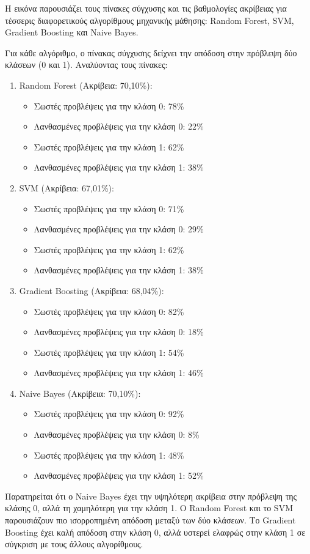 Η εικόνα παρουσιάζει τους πίνακες σύγχυσης και τις βαθμολογίες
ακρίβειας για τέσσερις διαφορετικούς αλγορίθμους μηχανικής μάθησης:
Random Forest, SVM, Gradient Boosting και Naive Bayes.

Για κάθε αλγόριθμο, ο πίνακας σύγχυσης δείχνει την απόδοση στην
πρόβλεψη δύο κλάσεων (0 και 1). Αναλύοντας τους πίνακες:

\begin{enumerate}
  \item Random Forest (Ακρίβεια: 70,10\%):
    \begin{itemize}
      \item Σωστές προβλέψεις για την κλάση 0: 78\%
      \item Λανθασμένες προβλέψεις για την κλάση 0: 22\%
      \item Σωστές προβλέψεις για την κλάση 1: 62\%
      \item Λανθασμένες προβλέψεις για την κλάση 1: 38\%
    \end{itemize}

  \item SVM (Ακρίβεια: 67,01\%):
    \begin{itemize}
      \item Σωστές προβλέψεις για την κλάση 0: 71\%
      \item Λανθασμένες προβλέψεις για την κλάση 0: 29\%
      \item Σωστές προβλέψεις για την κλάση 1: 62\%
      \item Λανθασμένες προβλέψεις για την κλάση 1: 38\%
    \end{itemize}

  \item Gradient Boosting (Ακρίβεια: 68,04\%):
    \begin{itemize}
      \item Σωστές προβλέψεις για την κλάση 0: 82\%
      \item Λανθασμένες προβλέψεις για την κλάση 0: 18\%
      \item Σωστές προβλέψεις για την κλάση 1: 54\%
      \item Λανθασμένες προβλέψεις για την κλάση 1: 46\%
    \end{itemize}

  \item Naive Bayes (Ακρίβεια: 70,10\%):
    \begin{itemize}
      \item Σωστές προβλέψεις για την κλάση 0: 92\%
      \item Λανθασμένες προβλέψεις για την κλάση 0: 8\%
      \item Σωστές προβλέψεις για την κλάση 1: 48\%
      \item Λανθασμένες προβλέψεις για την κλάση 1: 52\%
    \end{itemize}
\end{enumerate}

Παρατηρείται ότι ο Naive Bayes έχει την υψηλότερη ακρίβεια στην
πρόβλεψη της κλάσης 0, αλλά τη χαμηλότερη για την κλάση 1. Ο Random
Forest και το SVM παρουσιάζουν πιο ισορροπημένη απόδοση μεταξύ των
δύο κλάσεων. Το Gradient Boosting έχει καλή απόδοση στην κλάση 0,
αλλά υστερεί ελαφρώς στην κλάση 1 σε σύγκριση με τους άλλους αλγορίθμους.
